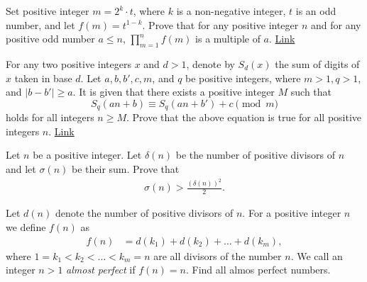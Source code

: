 \begin{problem}
	Set positive integer $m=2^k\cdot t$, where $k$ is a non-negative integer, $t$ is an odd number, and let $f(m)=t^{1-k}$. Prove that for any positive integer $n$ and for any positive odd number $a\le n$, $\prod_{m=1}^n f(m)$ is a multiple of $a$. \hfill \href{http://artofproblemsolving.com/community/c6h1215111p6043322}{Link}
\end{problem}




\begin{problem}
	For any two positive integers $x$ and $d>1$, denote by $S_d(x)$ the sum of digits of $x$ taken in base $d$. Let $a,b,b',c,m$, and $q$ be positive integers, where $m>1,q>1$, and $|b-b'|\ge a$. It is given that there exists a positive integer $M$ such that
	\[S_q(an+b)\equiv S_q(an+b')+c\pmod{m}\]
	holds for all integers $n\ge M$. Prove that the above equation is true for all positive integers $n$. \hfill \href{http://artofproblemsolving.com/community/c6h1217570p6069193}{Link}
\end{problem}




\begin{problem}
	Let $n$ be a positive integer. Let $\delta(n)$ be the number of positive divisors of $n$ and let $\sigma(n)$ be their sum. Prove that
	\begin{align*}
	\sigma(n) > \frac{\left(\delta(n)\right)^2}{2}.
	\end{align*}
\end{problem}


\begin{problem}
	Let $d(n)$ denote the number of positive divisors of $n$. For a positive integer $n$ we define $f(n)$ as
	\begin{align*}
	f(n) & = d(k_1) + d(k_2) + \dots + d(k_m),
	\end{align*}
	where $ 1=k_1 < k_2 < \dots < k_m=n$ are all divisors of the number $n$. We call an integer $n>1$ \textit{almost perfect} if $f(n)=n$. Find all almos perfect numbers.
\end{problem}

